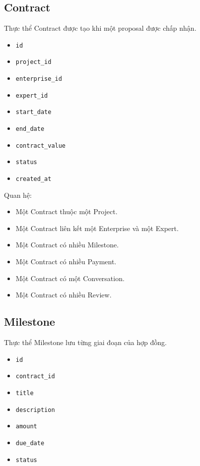 \subsection{Contract}

Thực thể Contract được tạo khi một proposal được chấp nhận.

\begin{itemize}
    \item \texttt{id}
    \item \texttt{project\_id}
    \item \texttt{enterprise\_id}
    \item \texttt{expert\_id}
    \item \texttt{start\_date}
    \item \texttt{end\_date}
    \item \texttt{contract\_value}
    \item \texttt{status}
    \item \texttt{created\_at}
\end{itemize}

Quan hệ:

\begin{itemize}
    \item Một Contract thuộc một Project.
    \item Một Contract liên kết một Enterprise và một Expert.
    \item Một Contract có nhiều Milestone.
    \item Một Contract có nhiều Payment.
    \item Một Contract có một Conversation.
    \item Một Contract có nhiều Review.
\end{itemize}

\subsection{Milestone}

Thực thể Milestone lưu từng giai đoạn của hợp đồng.

\begin{itemize}
    \item \texttt{id}
    \item \texttt{contract\_id}
    \item \texttt{title}
    \item \texttt{description}
    \item \texttt{amount}
    \item \texttt{due\_date}
    \item \texttt{status}
\end{itemize}

